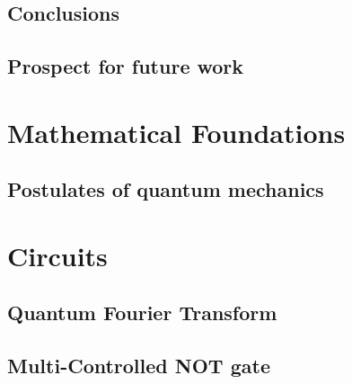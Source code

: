 \documentclass[
oneside,
11pt, a4paper,
footinclude=true,
headinclude=true,
cleardoublepage=empty
]{scrbook}
\begin{document}
\section{Conclusions}

\section{Prospect for future work}








\chapter{Mathematical Foundations}
\section{Postulates of quantum mechanics}\label{sec:PostulatesQM}

\chapter{Circuits}
\section{Quantum Fourier Transform}\label{sec:chapQFT}

\section{Multi-Controlled NOT gate}\label{sec:mcxQiskit}

\end{document}
